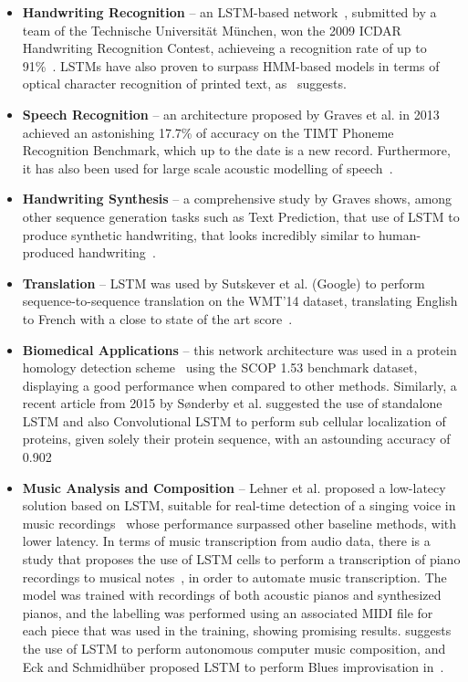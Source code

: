 \begin{itemize}
    \item \textbf{Handwriting Recognition} -- an LSTM-based network~\cite{Bertolami09}, submitted by a team of the Technische Universität München, won the 2009 ICDAR Handwriting Recognition Contest, achieveing a recognition rate of up to 91\%~\cite{ICDAR09}. LSTMs have also proven to surpass HMM-based models in terms of optical character recognition of printed text, as~\cite{Breuel13} suggests.

    \item \textbf{Speech Recognition} -- an architecture\cite{Graves13} proposed by Graves et al. in 2013 achieved an astonishing 17.7\% of accuracy on the TIMT Phoneme Recognition Benchmark, which up to the date is a new record. Furthermore, it has also been used for large scale acoustic modelling of speech~\cite{Sak14}.

    \item \textbf{Handwriting Synthesis} -- a comprehensive study by Graves shows, among other sequence generation tasks such as Text Prediction, that use of LSTM to produce synthetic handwriting, that looks incredibly similar to human-produced handwriting~\cite{Graves13_2}.

    \item \textbf{Translation} -- LSTM was used by Sutskever et al. (Google) to perform sequence-to-sequence translation on the WMT'14 dataset, translating English to French with a close to state of the art score~\cite{Sustkever14}.

    \item \textbf{Biomedical Applications} -- this network architecture was used in a protein homology detection scheme~\cite{Hochreiter07} using the SCOP 1.53 benchmark dataset, displaying a good performance when compared to other methods. Similarly, a recent article from 2015 by Sønderby et al. suggested the use of standalone LSTM and also Convolutional LSTM to perform sub cellular localization of proteins, given solely their protein sequence, with an astounding accuracy of 0.902~\cite{Sonderby15}

    \item \textbf{Music Analysis and Composition} -- Lehner et al. proposed a low-latecy solution based on LSTM, suitable for real-time detection of a singing voice in music recordings~\cite{Lehner15} whose performance surpassed other baseline methods, with lower latency. 
        In terms of music transcription from audio data, there is a study that proposes the use of LSTM cells to perform a transcription of piano recordings to musical notes~\cite{Bock12}, in order to automate music transcription. The model was trained with recordings of both acoustic pianos and synthesized pianos, and the labelling was performed using an associated MIDI file for each piece that was used in the training, showing promising results. \cite{Coca13} suggests the use of LSTM to perform autonomous computer music composition, and Eck and Schmidhüber proposed LSTM to perform Blues improvisation in~\cite{Eck02}.


\end{itemize}
